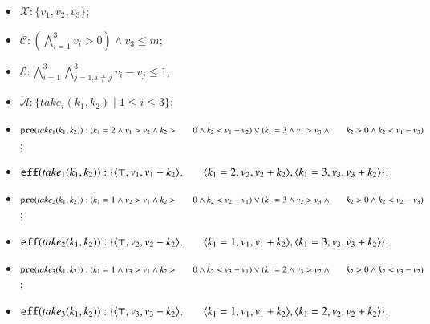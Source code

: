 \documentclass[review]{elsarticle}
\newcommand{\set}[1]{\{ #1 \}}
\newcommand{\tuple}[1]{\langle {#1} \rangle}
\newcommand{\true}{\top}
\newcommand{\statevar}{\mathcal{X}}
\newcommand{\act}{\mathcal{A}}
\newcommand{\constraint}{\mathcal{C}}
\newcommand{\estate}{\mathcal{E}}
\newcommand{\pre}{\mathtt{pre}}
\newcommand{\eff}{\mathtt{eff}}
\begin{document}
\begin{itemize}
	\item $\statevar: \set{v_1, v_2, v_3}$;
	\item $\constraint:(\bigwedge_{i=1}^{3} v_i > 0) \wedge  v_3 \le m$;
	\item $\estate: \bigwedge_{i=1}^{3}\bigwedge_{j=1,i\neq j}^{3} v_i - v_j \le 1$;
	\item $\act: \set{take_i(k_1, k_2){\mid}1\le i \le3 }$;
	\item $\pre(take_1(k_1, k_2)) : (k_1 = 2 \wedge v_1 > v_2 \wedge k_2 > \\ \hspace*{6mm}
	0 \wedge k_2 < v_1 - v_2)  \vee 
	(k_1 = 3 \wedge v_1 > v_3 \wedge \\ \hspace*{6mm}
	k_2 > 0 \wedge k_2 < v_1 - v_3) $;
	\item $\eff(take_1(k_1, k_2)) : \set{\tuple{\true,v_1,v_1 - k_2},\\ \hspace*{6mm}
		\tuple{k_1=2,v_2,v_2 + k_2},\tuple{k_1=3,v_3,v_3 + k_2}}$;
	\item $\pre(take_2(k_1, k_2)) : (k_1 = 1 \wedge v_2 > v_1 \wedge k_2 >  \\ \hspace*{6mm} 
	0 \wedge k_2 < v_2 - v_1)  \vee 
	(k_1 = 3 \wedge v_2 > v_3 \wedge \\ \hspace*{6mm}
	k_2 > 0 \wedge k_2 < v_2 - v_3) $;
	\item $\eff(take_2(k_1, k_2)) : \set{\tuple{\true,v_2,v_2 - k_2},\\ \hspace*{6mm}
		\tuple{k_1=1,v_1,v_1 + k_2},\tuple{k_1=3,v_3,v_3 + k_2}}$;
	\item $\pre(take_3(k_1, k_2)) : (k_1 = 1 \wedge v_3 > v_1 \wedge k_2 >  \\ \hspace*{6mm}
	0 \wedge k_2 < v_3 - v_1)  \vee 
	(k_1 = 2 \wedge v_3 > v_2 \wedge \\ \hspace*{6mm}
	k_2 > 0 \wedge k_2 < v_3 - v_2) $;
	\item $\eff(take_3(k_1, k_2)) : \set{\tuple{\true,v_3,v_3 - k_2},\\ \hspace*{6mm}
		\tuple{k_1=1,v_1,v_1 + k_2},\tuple{k_1=2,v_2,v_2 + k_2}}$.
\end{itemize}
\end{document}
